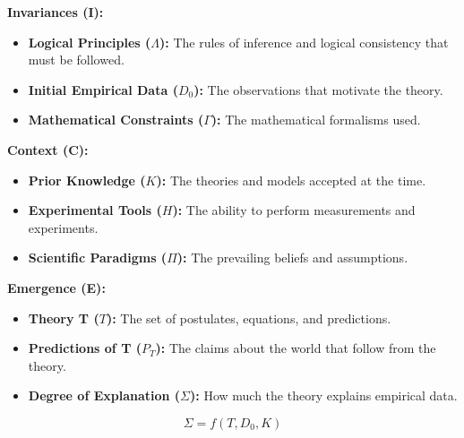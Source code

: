 \documentclass{article}
\begin{document}
\textbf{Invariances (I):}
\begin{itemize}
\item \textbf{Logical Principles (\(\Lambda\)):} The rules of inference and logical consistency that must be followed.
\item \textbf{Initial Empirical Data (\(D_0\)):} The observations that motivate the theory.
\item \textbf{Mathematical Constraints (\(\Gamma\)):} The mathematical formalisms used.
\end{itemize}
\textbf{Context (C):}
\begin{itemize}
\item \textbf{Prior Knowledge (\(K\)):} The theories and models accepted at the time.
\item \textbf{Experimental Tools (\(H\)):} The ability to perform measurements and experiments.
\item \textbf{Scientific Paradigms (\(\Pi\)):} The prevailing beliefs and assumptions.
\end{itemize}
\textbf{Emergence (E):}
\begin{itemize}
\item \textbf{Theory T (\(T\)):} The set of postulates, equations, and predictions.
\item \textbf{Predictions of T (\(P_T\)):} The claims about the world that follow from the theory.
\item \textbf{Degree of Explanation (\(\Sigma\)):} How much the theory explains empirical data.
\end{itemize}
$$ \Sigma = f(T, D_0, K) $$
\end{document}
